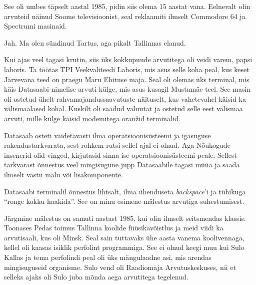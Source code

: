 

See oli umbes täpselt aastal 1985, pidin siis olema 15 aastat 
vana. Eelnevalt olin arvuteid näinud Soome televisioonist, 
seal reklaamiti ilmselt Commodore 64 ja Spectrumi masinaid. 


Jah. Ma olen sündinud Tartus, aga pikalt Tallinnas elanud. 

Kui ajas veel tagasi krutin, siis üks kokkupuude arvutitega oli 
veidi varem, papsi laboris. Ta töötas TPI Veekvaliteedi 
Laboris, mis asus selle koha peal, 
kus keset Järvevana teed on praegu Maru Ehituse maja. Seal oli olemas üks 
terminal, mis käis Datasaabi-nimelise 
arvuti külge, mis asus kusagil Mustamäe teel. 
See masin oli ostetud ühelt rahvamajandussaavutuste näituselt, kus 
vahetevahel käisid ka välismaalased kohal. Kuskilt oli saadud valuutat ja ostetud selle
eest välismaa arvuti, mille külge käisid modemitega oranžid terminalid. 

Datasaab osteti väidetavasti ilma 
operatsioonisüsteemi ja igasuguse rakendustarkvarata, sest rohkem 
rutsi sellel ajal ei olnud. Aga Nõukogude insenerid olid vinged, kirjutasid sinna ise operatsioonisüsteemi peale. Sellest tarkvarast õnnestus veel mingisugune jupp Datasaabile 
tagasi müüa ja saada ilmselt vastu mälu või 
lisakomponente. 

Datasaabi terminalil õnnestus 
lihtsalt, ilma ühenduseta \emph{backspace}'i ja tühikuga 
\enquote{ronge kokku haakida}. See on minu esimene mälestus arvutiga suhestumisest. 

Järgmine mälestus on samuti aastast 1985, kui olin 
ilmselt seitsmendas klassis. Toonases Pedas toimus Tallinna koolide 
füüsikavõistlus ja meid viidi ka arvutisaali, kus oli Minsk. Seal sain tuttavaks ühe aasta vanema
koolivennaga, 
kellel oli kaasas isiklik perfolint programmiga. See ei olnud
keegi muu kui Sulo Kallas ja tema perfolindi peal oli 
üks mängulaadne asi, mis arendas mingisuguseid 
organisme. 
Sulo vend oli Raadiomaja 
Arvutuskeskuses, nii et selleks ajaks oli Sulo 
juba mõnda aega arvutitega tegelenud. 

